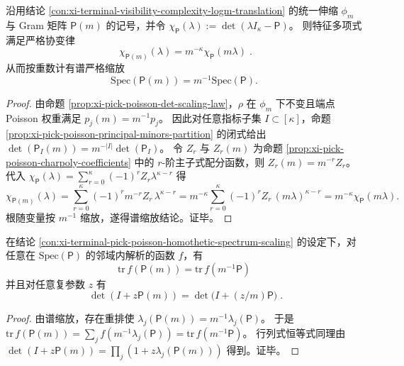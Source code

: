 \begin{conclusion}\label{con:xi-terminal-pick-poisson-homothetic-spectrum-scaling}
沿用结论 \ref{con:xi-terminal-visibility-complexity-logm-translation} 的统一伸缩 \(\phi_m\) 与 Gram 矩阵 \(\mathsf P(m)\) 的记号，并令 \(\chi_{\mathsf P}(\lambda):=\det(\lambda I_\kappa-\mathsf P)\)。
则特征多项式满足严格协变律
\[
\boxed{\;
\chi_{\mathsf P(m)}(\lambda)=m^{-\kappa}\chi_{\mathsf P}(m\lambda)\; } .
\]
从而按重数计有谱严格缩放
\[
\boxed{\;\mathrm{Spec}(\mathsf P(m))=m^{-1}\mathrm{Spec}(\mathsf P).\;}
\]
\end{conclusion}
\begin{proof}
由命题 \ref{prop:xi-pick-poisson-det-scaling-law}，\(\rho\) 在 \(\phi_m\) 下不变且端点 Poisson 权重满足 \(p_j(m)=m^{-1}p_j\)。
因此对任意指标子集 \(I\subset[\kappa]\)，命题 \ref{prop:xi-pick-poisson-principal-minors-partition} 的闭式给出
\(
\det(\mathsf P_I(m))=m^{-|I|}\det(\mathsf P_I)
\)。
令 \(Z_r\) 与 \(Z_r(m)\) 为命题 \ref{prop:xi-pick-poisson-charpoly-coefficients} 中的 \(r\)-阶主子式配分函数，则
\(
Z_r(m)=m^{-r}Z_r
\)。
代入 \(\chi_{\mathsf P}(\lambda)=\sum_{r=0}^\kappa (-1)^r Z_r \lambda^{\kappa-r}\) 得
\[
\chi_{\mathsf P(m)}(\lambda)
=\sum_{r=0}^\kappa (-1)^r m^{-r}Z_r\,\lambda^{\kappa-r}
=m^{-\kappa}\sum_{r=0}^\kappa(-1)^r Z_r\,(m\lambda)^{\kappa-r}
=m^{-\kappa}\chi_{\mathsf P}(m\lambda).
\]
根随变量按 \(m^{-1}\) 缩放，遂得谱缩放结论。证毕。
\end{proof}

\begin{conclusion}[全部谱函数的重整化恒等式]\label{con:xi-terminal-pick-poisson-spectral-function-renormalization}
在结论 \ref{con:xi-terminal-pick-poisson-homothetic-spectrum-scaling} 的设定下，对任意在 \(\mathrm{Spec}(\mathsf P)\) 的邻域内解析的函数 \(f\)，有
\[
\boxed{\;
\mathrm{tr}\,f(\mathsf P(m))=\mathrm{tr}\,f(m^{-1}\mathsf P)\;}
\]
并且对任意复参数 \(z\) 有
\[
\boxed{\;
\det(I+z\mathsf P(m))=\det\!\bigl(I+(z/m)\mathsf P\bigr)\; } .
\]
\end{conclusion}
\begin{proof}
由谱缩放，存在重排使 \(\lambda_j(\mathsf P(m))=m^{-1}\lambda_j(\mathsf P)\)。
于是 \(\mathrm{tr}\,f(\mathsf P(m))=\sum_j f(m^{-1}\lambda_j(\mathsf P))=\mathrm{tr}\,f(m^{-1}\mathsf P)\)。
行列式恒等式同理由 \(\det(I+z\mathsf P(m))=\prod_j(1+z\lambda_j(\mathsf P(m)))\) 得到。证毕。
\end{proof}

